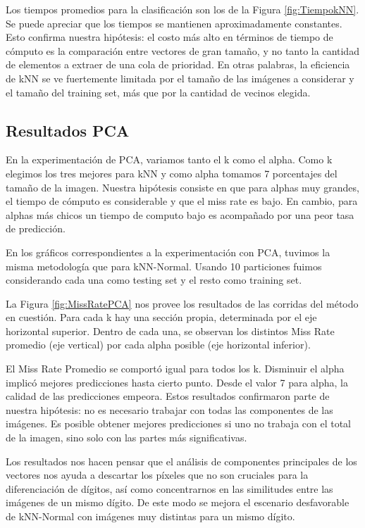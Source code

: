 \documentclass{article}
\begin{document}
Los tiempos promedios para la clasificación son los de la Figura \ref{fig:TiempokNN}. Se puede apreciar que los tiempos se mantienen aproximadamente constantes. Esto confirma nuestra hipótesis: el costo más alto en términos de tiempo de cómputo es la comparación entre vectores de gran tamaño, y no tanto la cantidad de elementos a extraer de una cola de prioridad. En otras palabras, la eficiencia de kNN se ve fuertemente limitada por el tamaño de las imágenes a considerar y el tamaño del training set, más que por la cantidad de vecinos elegida.

\subsection*{Resultados PCA}

En la experimentación de PCA, variamos tanto el k como el alpha. Como k elegimos los tres mejores para kNN y como alpha tomamos 7 porcentajes del tamaño de la imagen. Nuestra hipótesis consiste en que para alphas muy grandes, el tiempo de cómputo es considerable y que el miss rate es bajo. En cambio, para alphas más chicos un tiempo de computo bajo es acompañado por una peor tasa de predicción. 

En los gráficos correspondientes a la experimentación con PCA, tuvimos la misma metodología que para kNN-Normal. Usando 10 particiones fuimos considerando cada una como testing set y el resto como training set.

La Figura \ref{fig:MissRatePCA} nos provee los resultados de las corridas del método en cuestión. Para cada k hay una sección propia, determinada por el eje horizontal superior. Dentro de cada una, se observan los distintos Miss Rate promedio (eje vertical) por cada alpha posible (eje horizontal inferior). 

El Miss Rate Promedio se comportó igual para todos los k. Disminuir el alpha implicó mejores predicciones hasta cierto punto. Desde el valor 7 para alpha, la calidad de las predicciones empeora. Estos resultados confirmaron parte de nuestra hipótesis: no es necesario trabajar con todas las componentes de las imágenes. Es posible obtener mejores predicciones si uno no trabaja con el total de la imagen, sino solo con las partes más significativas. 

Los resultados nos hacen pensar que el análisis de componentes principales de los vectores nos ayuda a descartar los píxeles que no son cruciales para la diferenciación de dígitos, así como concentrarnos en las similitudes entre las imágenes de un mismo dígito. De este modo se mejora el escenario desfavorable de kNN-Normal con imágenes muy distintas para un mismo dígito.
\end{document}
